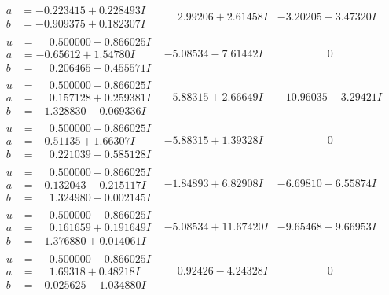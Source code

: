 \documentclass[1p]{elsarticle_modified}
\theoremstyle{definition}
\begin{document}
$$\begin{array}{c|c|c}
\begin{aligned}
a &= -0.223415 + 0.228493 I \\
b &= -0.909375 + 0.182307 I\end{aligned}
 & \phantom{-}2.99206 + 2.61458 I & -3.20205 - 3.47320 I \\ \hline\begin{aligned}
u &= \phantom{-}0.500000 - 0.866025 I \\
a &= -0.65612 + 1.54780 I \\
b &= \phantom{-}0.206465 - 0.455571 I\end{aligned}
 & -5.08534 - 7.61442 I & \phantom{-0.000000 } 0 \\ \hline\begin{aligned}
u &= \phantom{-}0.500000 - 0.866025 I \\
a &= \phantom{-}0.157128 + 0.259381 I \\
b &= -1.328830 - 0.069336 I\end{aligned}
 & -5.88315 + 2.66649 I & -10.96035 - 3.29421 I \\ \hline\begin{aligned}
u &= \phantom{-}0.500000 - 0.866025 I \\
a &= -0.51135 + 1.66307 I \\
b &= \phantom{-}0.221039 - 0.585128 I\end{aligned}
 & -5.88315 + 1.39328 I & \phantom{-0.000000 } 0 \\ \hline\begin{aligned}
u &= \phantom{-}0.500000 - 0.866025 I \\
a &= -0.132043 - 0.215117 I \\
b &= \phantom{-}1.324980 - 0.002145 I\end{aligned}
 & -1.84893 + 6.82908 I & -6.69810 - 6.55874 I \\ \hline\begin{aligned}
u &= \phantom{-}0.500000 - 0.866025 I \\
a &= \phantom{-}0.161659 + 0.191649 I \\
b &= -1.376880 + 0.014061 I\end{aligned}
 & -5.08534 + 11.67420 I & -9.65468 - 9.66953 I \\ \hline\begin{aligned}
u &= \phantom{-}0.500000 - 0.866025 I \\
a &= \phantom{-}1.69318 + 0.48218 I \\
b &= -0.025625 - 1.034880 I\end{aligned}
 & \phantom{-}0.92426 - 4.24328 I & \phantom{-0.000000 } 0 \\ \hline\begin{aligned}

\end{aligned}
\end{array}$$
\end{document}
